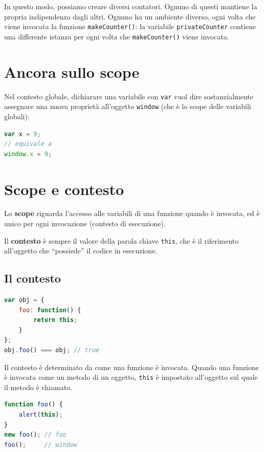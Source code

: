In questo modo, possiamo creare diversi contatori. Ognuno di questi mantiene la propria indipendenza dagli altri. Ognuno ha un ambiente diverso, ogni volta che viene invocata la funzione \texttt{makeCounter()}: la variabile \texttt{privateCounter} contiene una differente istanza per ogni volta che \texttt{makeCounter()} viene invocata.

\section{Ancora sullo scope}

Nel contesto globale, dichiarare una variabile con \texttt{var} vuol dire sostanzialmente assegnare una nuova proprietà all'oggetto \texttt{window} (che è lo scope delle variabili globali):

\begin{lstlisting}[language=JavaScript]
var x = 9;
// equivale a
window.x = 9;
\end{lstlisting}

\section{Scope e contesto}

Lo \textbf{scope} riguarda l'accesso alle variabili di una funzione quando è invocata, ed è unico per ogni invocazione (contesto di esecuzione).

Il \textbf{contesto} è sempre il valore della parola chiave \texttt{this}, che è il riferimento all'oggetto che ``possiede'' il codice in esecuzione.

\subsection{Il contesto}

\begin{lstlisting}[language=JavaScript]
var obj = {
    foo: function() {
        return this;
    }
};
obj.foo() === obj; // true
\end{lstlisting}

Il contesto è determinato da come una funzione è invocata. Quando una funzione è invocata come un metodo di un oggetto, \texttt{this} è impostato all'oggetto sul quale il metodo è chiamato.

\begin{lstlisting}[language=JavaScript]
function foo() {
    alert(this);
}
new foo(); // foo
foo();     // window
\end{lstlisting}

